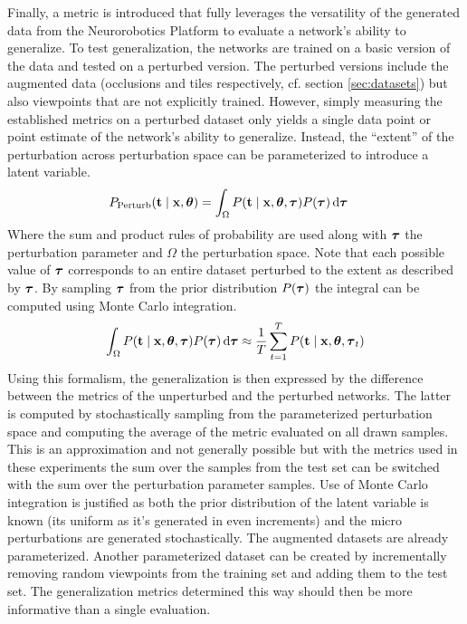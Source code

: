 Finally, a metric is introduced that fully leverages the versatility of the generated data from the Neurorobotics Platform to evaluate a network's ability to generalize. To test generalization, the networks are trained on a basic version of the data and tested on a perturbed version. The perturbed versions include the augmented data (occlusions and tiles respectively, cf. section \ref{sec:datasets}) but also viewpoints that are not explicitly trained. However, simply measuring the established metrics on a perturbed dataset only yields a single data point or point estimate of the network's ability to generalize. Instead, the \enquote{extent} of the perturbation across perturbation space can be parameterized to introduce a latent variable.
\begin{align}
     P_{\mathrm{Perturb}}\qty(\vb{t}\mid \vb{x},\vb*{\theta}) &= \int_{\Omega} P\qty(\vb{t}\mid \vb{x},\vb*{\theta},\vb*{\tau}) P\qty(\vb*{\tau}) \dd{\vb*{\tau}}
\end{align}
Where the sum and product rules of probability are used along with $\vb*{\tau}$ the perturbation parameter and $\Omega$ the perturbation space. Note that each possible value of $\vb*{\tau}$ corresponds to an entire dataset perturbed to the extent as described by $\vb*{\tau}$. By sampling $\vb*{\tau}$ from the prior distribution $P\qty(\vb*{\tau})$ the integral can be computed using Monte Carlo integration.
\begin{align}
    \int_{\Omega} P\qty(\vb{t}\mid \vb{x},\vb*{\theta},\vb*{\tau}) P\qty(\vb*{\tau}) \dd{\vb*{\tau}} \approx \frac{1}{T} \sum_{t=1}^T P\qty(\vb{t}\mid \vb{x},\vb*{\theta},\vb*{\tau}_t)
\end{align}
Using this formalism, the generalization is then expressed by the difference between the metrics of the unperturbed and the perturbed networks. The latter is computed by stochastically sampling from the parameterized perturbation space and computing the average of the metric evaluated on all drawn samples. This is an approximation and not generally possible but with the metrics used in these experiments the sum over the samples from the test set can be switched with the sum over the perturbation parameter samples. Use of Monte Carlo integration is justified as both the prior distribution of the latent variable is known (its uniform as it's generated in even increments) and the micro perturbations are generated stochastically. The augmented datasets are already parameterized. Another parameterized dataset can be created by incrementally removing random viewpoints from the training set and adding them to the test set. The generalization metrics determined this way should then be more informative than a single evaluation.